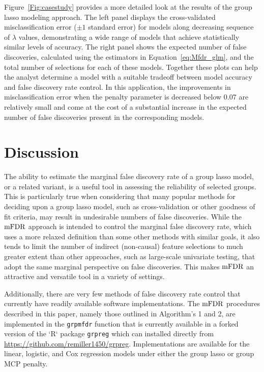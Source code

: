 Figure~\ref{Fig:casestudy} provides a more detailed look at the results of the group lasso modeling approach. The left panel displays the cross-validated misclassification error ($\pm 1$ standard error) for models along decreasing sequence of $\lambda$ values, demonstrating a wide range of models that achieve statistically similar levels of accuracy. The right panel shows the expected number of false discoveries, calculated using the estimators in Equation~\ref{eq:Mfdr_glm}, and the total number of selections for each of these models. Together these plots can help the analyst determine a model with a suitable tradeoff between model accuracy and false discovery rate control. In this application, the improvements in misclassification error when the penalty parameter is decreased below 0.07 are relatively small and come at the cost of a substantial increase in the expected number of false discoveries present in the corresponding models.

\section{Discussion}

The ability to estimate the marginal false discovery rate of a group lasso model, or a related variant, is a useful tool in assessing the reliability of selected groups. This is particularly true when considering that many popular methods for deciding upon a group lasso model, such as cross-validation or other goodness of fit criteria, may result in undesirable numbers of false discoveries. While the $\textrm{mFDR}$ approach is intended to control the marginal false discovery rate, which uses a more relaxed definition than some other methods with similar goals, it also tends to limit the number of indirect (non-causal) feature selections to much greater extent than other approaches, such as large-scale univariate testing, that adopt the same marginal perspective on false discoveries.  This makes $\textrm{mFDR}$ an attractive and versatile tool in a variety of settings.

Additionally, there are very few methods of false discovery rate control that currently have readily available software implementations. The $\textrm{mFDR}$ procedures described in this paper, namely those outlined in Algorithm's 1 and 2, are implemented in the {\tt grpmfdr} function that is currently available in a forked version of the `R` package {\tt grpreg} \citep{Breheny2009} which can installed directly from \url{https://github.com/remiller1450/grpreg}. Implementations are available for the linear, logistic, and Cox regression models under either the group lasso or group MCP penalty. 

